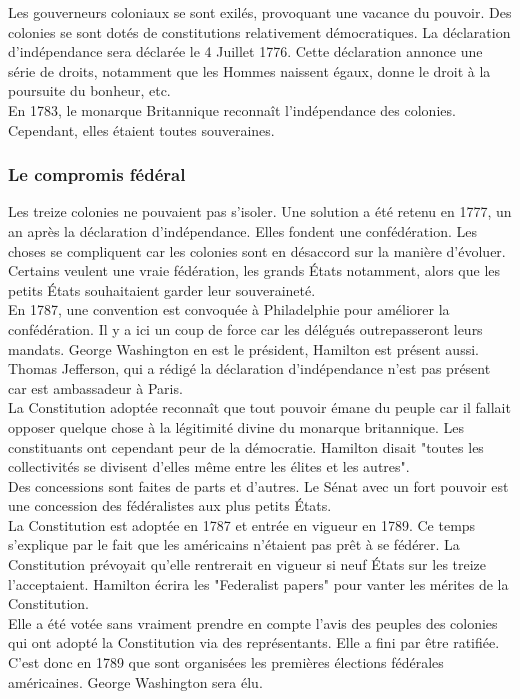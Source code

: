 \documentclass[10pt, a4paper, openany]{book}
\begin{document}
Les gouverneurs coloniaux se sont exilés, provoquant une vacance du pouvoir. Des colonies se sont dotés de constitutions relativement démocratiques. La déclaration d'indépendance sera déclarée le 4 Juillet 1776. Cette déclaration annonce une série de droits, notamment que les Hommes naissent égaux, donne le droit à la poursuite du bonheur, etc. \\
En 1783, le monarque Britannique reconnaît l'indépendance des colonies. Cependant, elles étaient toutes souveraines.

\subsubsection{Le compromis fédéral}

Les treize colonies ne pouvaient pas s'isoler. Une solution a été retenu en 1777, un an après la déclaration d'indépendance. Elles fondent une confédération. Les choses se compliquent car les colonies sont en désaccord sur la manière d'évoluer. Certains veulent une vraie fédération, les grands États notamment, alors que les petits États souhaitaient garder leur souveraineté. \\
En 1787, une convention est convoquée à Philadelphie pour améliorer la confédération. Il y a ici un coup de force car les délégués outrepasseront leurs mandats. George Washington en est le président, Hamilton est présent aussi. Thomas Jefferson, qui a rédigé la déclaration d'indépendance n'est pas présent car est ambassadeur à Paris. \\
La Constitution adoptée reconnaît que tout pouvoir émane du peuple car il fallait opposer quelque chose à la légitimité divine du monarque britannique. Les constituants ont cependant peur de la démocratie. Hamilton disait "toutes les collectivités se divisent d'elles même entre les élites et les autres". \\
Des concessions sont faites de parts et d'autres. Le Sénat avec un fort pouvoir est une concession des fédéralistes aux plus petits États. \\
La Constitution est adoptée en 1787 et entrée en vigueur en 1789. Ce temps s'explique par le fait que les américains n'étaient pas prêt à se fédérer. La Constitution prévoyait qu'elle rentrerait en vigueur si neuf États sur les treize l'acceptaient. Hamilton écrira les "Federalist papers" pour vanter les mérites de la Constitution. \\
Elle a été votée sans vraiment prendre en compte l'avis des peuples des colonies qui ont adopté la Constitution via des représentants. Elle a fini par être ratifiée. C'est donc en 1789 que sont organisées les premières élections fédérales américaines. George Washington sera élu.
\end{document}

